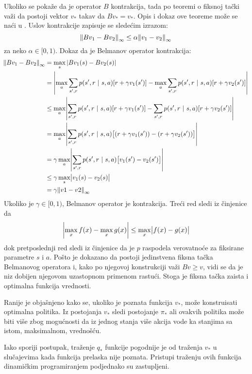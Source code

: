 Ukoliko se pokaže da je operator $B$ kontrakcija, tada po teoremi o fiksnoj tački važi da postoji vektor $v_*$ takav da $Bv_*=v_*$. Opis i dokaz ove teoreme može se naći u \cite{num_met}. Uslov kontrakcije zapisuje se sledećim izrazom:
\begin{equation}
	\norm{Bv_1-Bv_2}_{\infty} \leq \alpha \norm{v_1-v_2}_{\infty}
\end{equation}
za neko $\alpha \in [0, 1)$. 
Dokaz da je Belmanov operator kontrakcija:
\begin{align}
	\norm{Bv_1-Bv_2}_{\infty} &= \max_s |Bv_1(s)-Bv_2(s)| \\
	&= \mabs*{\max_{a}\sum_{s', r}^{} p(s', r~|~s,a)[r+\gamma v_1(s')] - \max_{a}\sum_{s', r}^{} p(s', r~|~s,a)[r+\gamma v_2(s')]} \\
	&\leq \max_{a} \mabs*{\sum_{s', r}^{} p(s', r~|~s,a)[r+\gamma v_1(s')] - \sum_{s', r}^{} p(s', r~|~s,a)[r+\gamma v_2(s')]} \\
	&=\max_{a} \mabs*{ \sum_{s', r}^{} p(s', r~|~s,a) \big[(r+\gamma v_1(s'))-(r+\gamma v_2(s'))\big]} \\
	&=\gamma\max_{a} \mabs*{ \sum_{s', r}^{} p(s', r~|~s,a)\big[v_1(s')-v_2(s')\big]} \\
	&\leq \gamma \max_s \mabs*{v_1(s)-v_2(s)} \\
	&= \gamma \norm{v1-v2}_{\infty}
\end{align}
Ukoliko je $\gamma \in [0, 1)$, Belmanov operator je kontrakcija. Treći red sledi iz činjenice da 
\begin{equation}
	\mabs*{\max_{x} f(x) - \max_{x} g(x)} \leq \max_{x}\mabs*{f(x)-g(x)}
\end{equation}
dok pretposlednji red sledi iz činjenice da je $p$ raspodela verovatnoće za fiksirane parametre $s$ i $a$. Pošto je dokazano da postoji jedinstvena fiksna tačka Belmanovog operatora i, kako po njegovoj konstrukciji važi $Bv \geq v$, vidi se da je niz dobijen njegovom uzastopnom primenom rastući. Stoga je fiksna tačka zaista i optimalna funkcija vrednosti.
\par 
Ranije je objašnjeno kako se, ukoliko je poznata funkcija $v_*$, može konstruisati optimalna politika. Iz postojanja $v_*$ sledi postojanje $\pi_*$ ali ovakvih politika može biti više zbog mogućnosti da iz jednog stanja više akcija vode ka stanjima sa istom, maksimalnom, vrednošću. 
\par 
Iako sporiji postupak, traženje $q_*$ funkcije pogodnije je od traženja $v_*$ u slučajevima kada funkcija prelaska nije poznata. Pristupi traženju ovih funkcija dinamičkim programiranjem podjednako su zastupljeni. 

